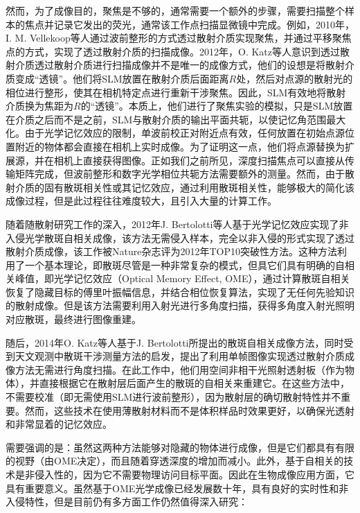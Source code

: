 然而，为了成像目的，聚焦是不够的，通常需要一个额外的步骤，需要扫描整个样本的焦点并记录它发出的荧光，通常该工作点扫描显微镜中完成。例如，2010年，I. M. Vellekoop等人\cite{vellekoop_scattered_2010}通过波前整形的方式透过散射介质实现聚焦，并通过平移聚焦点的方式，实现了透过散射介质的扫描成像。2012年，O. Katz等人\cite{katz_looking_2012}意识到透过散射介质透过散射介质进行扫描成像并不是唯一的成像方式，他们的设想是将散射介质变成“透镜”。他们将SLM放置在散射介质后面距离$R$处，然后对点源的散射光的相位进行整形，使其在相机特定点进行重新干涉聚焦。因此，SLM有效地将散射介质换为焦距为$R$的“透镜”。本质上，他们进行了聚焦实验的模拟，只是SLM放置在介质之后而不是之前，SLM与散射介质的输出平面共轭，以使记忆角范围最大化。由于光学记忆效应的限制，单波前校正对附近点有效，任何放置在初始点源位置附近的物体都会直接在相机上实时成像。为了证明这一点，他们将点源替换为扩展源，并在相机上直接获得图像。正如我们之前所见，深度扫描焦点可以直接从传输矩阵完成，但波前整形和数字光学相位共轭方法需要额外的测量。然而，由于散射介质的固有散斑相关性或其记忆效应，通过利用散斑相关性，能够极大的简化该成像过程，但是此过程往往难度较大，且引入大量的计算工作。

随着随散射研究工作的深入，2012年J. Bertolotti等人\cite{bertolotti_non-invasive_2012}基于光学记忆效应实现了非入侵光学散斑自相关成像，该方法无需侵入样本，完全以非入侵的形式实现了透过散射介质成像，该工作被Nature杂志评为2012年TOP10突破性方法。这种方法利用了一个基本理论，即散斑尽管是一种非常复杂的模式，但具它们具有明确的自相关峰值，即光学记忆效应（Optical Memory Effect, OME）\cite{Freund1988}，通过计算散斑自相关恢复了隐藏目标的傅里叶振幅信息，并结合相位恢复算法，实现了无任何先验知识的散射成像。但是该方法需要利用入射光进行多角度扫描，获得多角度入射光照明对应散斑，最终进行图像重建。

随后，2014年O. Katz等人\cite{katz_non-invasive_2014}基于J. Bertolotti所提出的散斑自相关成像方法，同时受到天文观测中散斑干涉测量方法的启发，提出了利用单帧图像实现透过散射介质成像方法无需进行角度扫描。在此工作中，他们用空间非相干光照射透射板（作为物体），并直接根据它在散射层后面产生的散斑的自相关来重建它。在这些方法中，不需要校准（即无需使用SLM进行波前整形），因为散射层的确切散射特性并不重要。然而，这些技术在使用薄散射材料而不是体积样品时效果更好，以确保光透射和非常显着的记忆效应。

需要强调的是：虽然这两种方法\cite{bertolotti_non-invasive_2012,katz_non-invasive_2014}能够对隐藏的物体进行成像，但是它们都具有有限的视野（由OME决定），而且随着穿透深度的增加而减小。此外，基于自相关的技术是非侵入性的，因为它不需要物理访问目标平面。因此在生物成像应用方面，它具有重要意义。虽然基于OME光学成像已经发展数十年，具有良好的实时性和非入侵特性，但是目前仍有多方面工作仍然值得深入研究：

